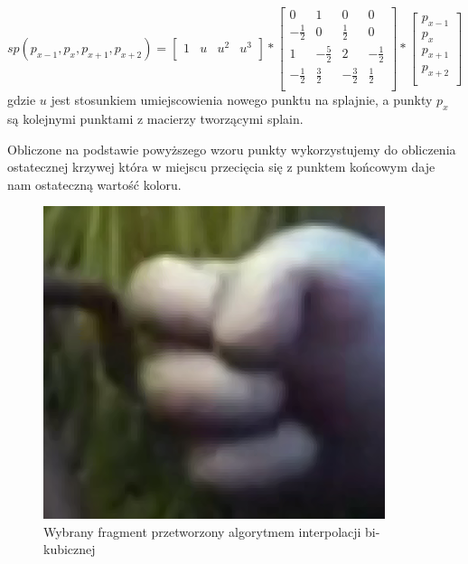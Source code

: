 \documentclass[twoside]{projektInzynierskiMS}
\begin{document}
$sp(p_{x-1},p_x,p_{x+1},p_{x+2}) = 
\begin{bmatrix}
	1 & u & u^2 & u^3 \\[0.3em]
\end{bmatrix}
*
\begin{bmatrix}
	0 & 1 & 0 & 0 \\[0.3em]
	-\frac{1}{2} & 0 & \frac{1}{2} & 0 \\[0.3em]
	1 & -\frac{5}{2} & 2 & -\frac{1}{2} \\[0.3em]
	-\frac{1}{2} & \frac{3}{2} & -\frac{3}{2} & \frac{1}{2} \\[0.3em]
\end{bmatrix}
*
\begin{bmatrix}
	p_{x-1} \\[0.3em]
	p_x \\[0.3em]
	p_{x+1} \\[0.3em]
	p_{x+2} \\[0.3em]
\end{bmatrix}
$
\\
gdzie $u$ jest stosunkiem umiejscowienia nowego punktu na splajnie, a punkty $p_x$ są kolejnymi punktami z macierzy tworzącymi splain.

Obliczone na podstawie powyższego wzoru punkty wykorzystujemy do obliczenia ostatecznej krzywej która w miejscu przecięcia się z punktem końcowym daje nam ostateczną wartość koloru. 

\begin{figure}[h]
\centering
\includegraphics[width=10cm]{HandBiCubic.png}
\caption{Wybrany fragment przetworzony algorytmem interpolacji bi-kubicznej}
\label{fig:handBiCubic}
\end{figure}
\end{document}
